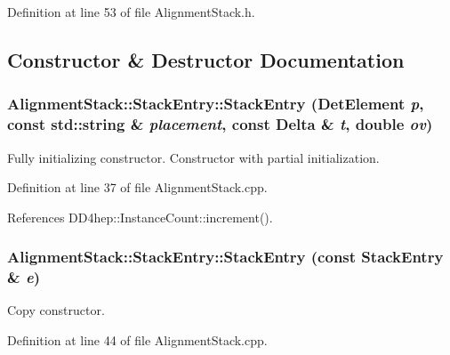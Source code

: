 Definition at line 53 of file AlignmentStack.h.

\subsection{Constructor \& Destructor Documentation}
\hypertarget{struct_d_d4hep_1_1_alignments_1_1_alignment_stack_1_1_stack_entry_ab70af826b6e4ccdfccf5b0ba45914fae}{
\subsubsection[{StackEntry}]{\setlength{\rightskip}{0pt plus 5cm}AlignmentStack::StackEntry::StackEntry ({\bf DetElement} {\em p}, \/  const std::string \& {\em placement}, \/  const {\bf Delta} \& {\em t}, \/  double {\em ov})}}
\label{struct_d_d4hep_1_1_alignments_1_1_alignment_stack_1_1_stack_entry_ab70af826b6e4ccdfccf5b0ba45914fae}


Fully initializing constructor. Constructor with partial initialization. 

Definition at line 37 of file AlignmentStack.cpp.

References DD4hep::InstanceCount::increment().\hypertarget{struct_d_d4hep_1_1_alignments_1_1_alignment_stack_1_1_stack_entry_a9c332ece4923052e68db8d9ff9b2e72a}{
\subsubsection[{StackEntry}]{\setlength{\rightskip}{0pt plus 5cm}AlignmentStack::StackEntry::StackEntry (const {\bf StackEntry} \& {\em e})}}
\label{struct_d_d4hep_1_1_alignments_1_1_alignment_stack_1_1_stack_entry_a9c332ece4923052e68db8d9ff9b2e72a}


Copy constructor. 

Definition at line 44 of file AlignmentStack.cpp.

